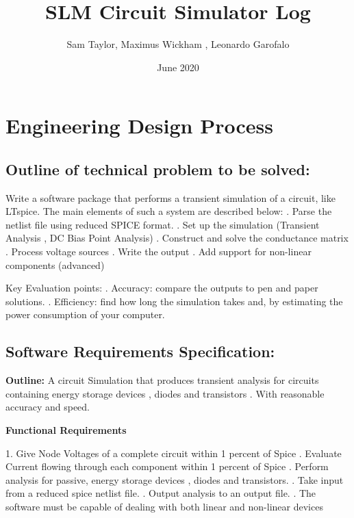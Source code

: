 \documentclass{article}
\title{SLM Circuit Simulator Log}
\author{Sam Taylor, Maximus Wickham , Leonardo Garofalo}
\date{June 2020}
\begin{document}
\maketitle
\tableofcontents
\newpage

\section{Engineering Design Process}
\flushleft

\subsection{Outline of technical problem to be solved:}
\flushleft

\smallbreak
Write a software package that performs a transient simulation of a circuit, like LTspice. The main elements of such a system are described below:
\newline
{}. Parse the netlist file using reduced SPICE format.
. Set up the simulation (Transient Analysis , DC Bias Point Analysis)
. Construct and solve the conductance matrix
. Process voltage sources
. Write the output
. Add support for non-linear components (advanced)
\newline
\mediumbreak 

Key Evaluation points:
. Accuracy: compare the outputs to pen and paper solutions. 
. Efficiency: find how long the simulation takes and, by estimating the power consumption of your computer.

\subsection{Software Requirements Specification:}
\flushleft
\textbf{Outline:} A circuit Simulation that produces transient analysis for circuits containing energy storage devices , diodes and transistors . With reasonable accuracy and speed.

\bigbreak

\textbf{Functional Requirements}

\newline

1. Give Node Voltages of a complete circuit within 1 percent of Spice
. Evaluate Current flowing through each component within 1 percent of Spice
. Perform analysis for passive, energy storage devices , diodes and transistors.
. Take input from a reduced spice netlist file.
. Output analysis to an output file.
. The software must be capable of dealing with both linear and non-linear devices
\end{document}
